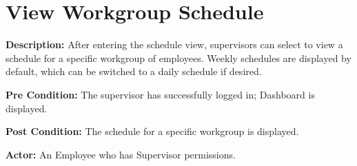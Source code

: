 \documentclass[letterpaper,12pt]{report}
\begin{document}
\pagebreak
\section{View Workgroup Schedule}
\begin{description}
 \item \textbf{Description:} \newline After entering the schedule view, supervisors can select to view a schedule for a specific workgroup of employees.  Weekly schedules are displayed by default, which can be switched to a daily schedule if desired.
 \item \textbf{Pre Condition:} \newline The supervisor has successfully logged in; Dashboard is displayed.
 \item \textbf{Post Condition:} \newline The schedule for a specific workgroup is displayed.
 \item \textbf{Actor:} \newline An Employee who has Supervisor permissions.
\end{description}
\end{document}
